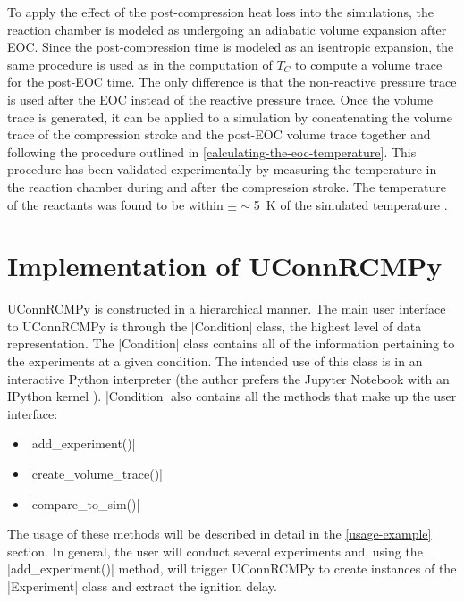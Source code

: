\documentclass[12pt]{../ussci}
\begin{document}
To apply the effect of the post-compression heat loss into the
simulations, the reaction chamber is modeled as undergoing an adiabatic
volume expansion after EOC. Since the post-compression time is modeled as an
isentropic expansion, the same procedure is used as in the computation
of \(T_C\) to compute a volume trace for the post-EOC time. The only
difference is that the non-reactive pressure trace is used after the EOC
instead of the reactive pressure trace. Once the volume trace is
generated, it can be applied to a simulation by concatenating the volume
trace of the compression stroke and the post-EOC volume trace together
and following the procedure outlined in \cref{calculating-the-eoc-temperature}.
This procedure has been validated experimentally by measuring the temperature
in the reaction chamber during and after the compression stroke. The
temperature of the reactants was found to be within $\pm\sim $\SI{5}{\K} of the
simulated temperature \autocite{Das2012a,Uddi2012}.

\section{Implementation of UConnRCMPy}\label{implementation-of-uconnrcmpy}

UConnRCMPy is constructed in a hierarchical manner. The main user
interface to UConnRCMPy is through the \python|Condition| class, the
highest level of data representation. The \python|Condition| class
contains all of the information pertaining to the experiments at a given
condition. The intended use of this class is in an interactive Python
interpreter (the author prefers the Jupyter Notebook with an IPython
kernel \autocite{Perez2007}). \python|Condition| also contains all the
methods that make up the user interface:

\begin{itemize}
\item
  \python|add_experiment()|
\item
  \python|create_volume_trace()|
\item
  \python|compare_to_sim()|
\end{itemize}

The usage of these methods will be described in detail in the
\cref{usage-example} section. In general, the user will
conduct several experiments and, using the \python|add_experiment()|
method, will trigger UConnRCMPy to create instances of the
\python|Experiment| class and extract the ignition delay.
\end{document}
